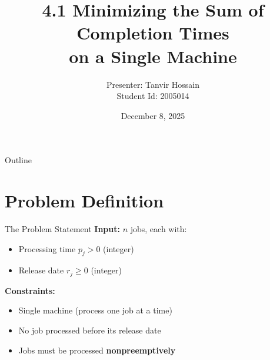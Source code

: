 \documentclass[aspectratio=169, 12pt]{beamer}
\title[Minimizing Sum of Completion Times]{4.1 Minimizing the Sum of Completion Times \\ on a Single Machine}
\author[Tanvir (2005014)]{Presenter: Tanvir Hossain \\ Student Id: 2005014}
\date{December 8, 2025}
\begin{document}
\begin{frame}
    \titlepage
\end{frame}

\begin{frame}{Outline}
    \tableofcontents
\end{frame}

\section{Problem Definition}

\begin{frame}{The Problem Statement}
    \textbf{Input:} $n$ jobs, each with:
    \begin{itemize}
        \item<2-> Processing time $p_j > 0$ (integer)
        \item<3-> Release date $r_j \geq 0$ (integer)
    \end{itemize}

    \vspace{0.5cm}
    \textbf{Constraints:}
    \begin{itemize}
        \item<4-> Single machine (process one job at a time)
        \item<5-> No job processed before its release date
        \item<6-> Jobs must be processed \textbf{nonpreemptively}
    \end{itemize}

    \vspace{0.5cm}
\end{frame}
\end{document}
